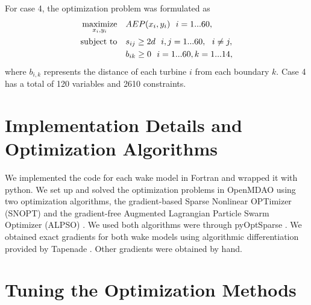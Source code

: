 \documentclass[journal abbreviation, manuscript]{copernicus}
\begin{document}
	For case 4, the optimization problem was formulated as
	\begin{equation}
		\label{eqn:opt3}
		\begin{aligned} [b]
			\underset{x_i,y_i}{\textrm{maximize}} \quad & AEP(x_i,y_i)~~i=1...60,\\
			\textrm{subject to} \quad & s_{ij} \geq 2\*d~~i,j=1...60,~~i \neq j,\\
			& b_{ik} \geq 0 ~~ i=1...60, k=1...14,
		\end{aligned}
	\end{equation}
	where $b_{i,k}$ represents the distance of each turbine $i$ from each boundary $k$. Case 4 has a total of 120 variables and 2610 constraints.
	
	\section{Implementation Details and Optimization Algorithms}\label{sec:computation}
	We implemented the code for each wake model in Fortran and wrapped it with python. We set up and solved the optimization problems in OpenMDAO \cite{gray2010_OpenMDAO} using two optimization algorithms, the gradient-based Sparse Nonlinear OPTimizer (SNOPT)  \cite{gill2005} and the gradient-free Augmented Lagrangian Particle Swarm Optimizer (ALPSO) \cite{jansen2011_alpso}. We used both algorithms were through pyOptSparse \cite{perez2012a}. We obtained exact gradients for both wake models using algorithmic differentiation provided by Tapenade \cite{tapenade2013}. Other gradients were obtained by hand. 
	
	\section{Tuning the Optimization Methods}\label{sec:tuning}
	
\end{document}
